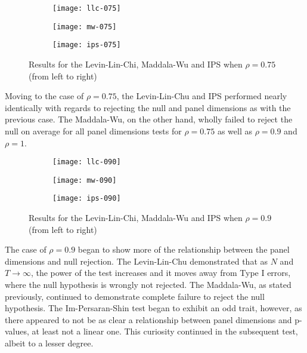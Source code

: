 \begin{figure}[htp]
	\centering
	\begin{subfigure}{0.3\textwidth}
		\centering
		\texttt{[image: llc-075]}
	\end{subfigure}
	\begin{subfigure}{0.3\textwidth}
		\centering
		\texttt{[image: mw-075]}
	\end{subfigure}
	\begin{subfigure}{0.3\textwidth}
		\centering
		\texttt{[image: ips-075]}
	\end{subfigure}
	\caption{Results for the Levin-Lin-Chi, Maddala-Wu and IPS when $\rho = 0.75$ (from left to right)}
\end{figure}

Moving to the case of $\rho = 0.75$, the Levin-Lin-Chu and IPS performed nearly identically with regards to rejecting the null and panel dimensions as with the previous case. The Maddala-Wu, on the other hand, wholly failed to reject the null on average for all panel dimensions tests for $\rho = 0.75$ as well as $\rho = 0.9$ and $\rho = 1$.

\begin{figure}[htp]
	\centering
	\begin{subfigure}{0.3\textwidth}
		\centering
		\texttt{[image: llc-090]}
	\end{subfigure}
	\begin{subfigure}{0.3\textwidth}
		\centering
		\texttt{[image: mw-090]}
	\end{subfigure}
	\begin{subfigure}{0.3\textwidth}
		\centering
		\texttt{[image: ips-090]}
	\end{subfigure}
	\caption{Results for the Levin-Lin-Chi, Maddala-Wu and IPS when $\rho = 0.9$ (from left to right)}
\end{figure}


The case of $\rho = 0.9$ began to show more of the relationship between the panel dimensions and null rejection. The Levin-Lin-Chu demonstrated that as $N$ and $T \to \infty$, the power of the test increases and it moves away from Type I errors, where the null hypothesis is wrongly not rejected. The Maddala-Wu, as stated previously, continued to demonstrate complete failure to reject the null hypothesis. The Im-Persaran-Shin test began to exhibit an odd trait, however, as there appeared to not be as clear a relationship between panel dimensions and p-values, at least not a linear one. This curiosity continued in the subsequent test, albeit to a lesser degree.

